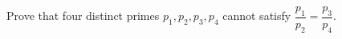 Prove that four distinct primes $p_1,p_2,p_3,p_4$ cannot satisfy $\dfrac{p_1}{p_2}=\dfrac{p_3}{p_4}$.
